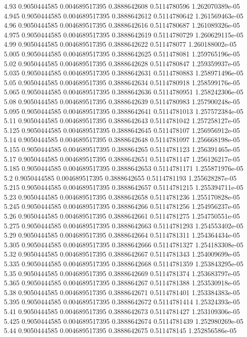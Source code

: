 {4.93 0.9050444585 0.004689517395 0.3888642608 0.5114780596 1.262070389e-05
4.945 0.9050444585 0.004689517395 0.3888642612 0.5114780642 1.261569463e-05
4.96 0.9050444585 0.004689517395 0.3888642616 0.5114780687 1.261089326e-05
4.975 0.9050444585 0.004689517395 0.3888642619 0.5114780729 1.260629115e-05
4.99 0.9050444585 0.004689517395 0.3888642622 0.511478077 1.260188002e-05
5.005 0.9050444585 0.004689517395 0.3888642625 0.511478081 1.259765196e-05
5.02 0.9050444585 0.004689517395 0.3888642628 0.5114780847 1.259359937e-05
5.035 0.9050444585 0.004689517395 0.3888642631 0.5114780883 1.258971496e-05
5.05 0.9050444585 0.004689517395 0.3888642634 0.5114780918 1.258599176e-05
5.065 0.9050444585 0.004689517395 0.3888642636 0.5114780951 1.258242306e-05
5.08 0.9050444585 0.004689517395 0.3888642639 0.5114780983 1.257900248e-05
5.095 0.9050444585 0.004689517395 0.3888642641 0.5114781013 1.257572384e-05
5.11 0.9050444585 0.004689517395 0.3888642643 0.5114781042 1.257258127e-05
5.125 0.9050444585 0.004689517395 0.3888642645 0.511478107 1.256956912e-05
5.14 0.9050444585 0.004689517395 0.3888642648 0.5114781097 1.256668198e-05
5.155 0.9050444585 0.004689517395 0.388864265 0.5114781123 1.256391465e-05
5.17 0.9050444585 0.004689517395 0.3888642651 0.5114781147 1.256126217e-05
5.185 0.9050444585 0.004689517395 0.3888642653 0.5114781171 1.255871976e-05
5.2 0.9050444585 0.004689517395 0.3888642655 0.5114781193 1.255628287e-05
5.215 0.9050444585 0.004689517395 0.3888642657 0.5114781215 1.255394711e-05
5.23 0.9050444585 0.004689517395 0.3888642658 0.5114781236 1.255170828e-05
5.245 0.9050444585 0.004689517395 0.388864266 0.5114781256 1.254956237e-05
5.26 0.9050444585 0.004689517395 0.3888642661 0.5114781275 1.254750551e-05
5.275 0.9050444585 0.004689517395 0.3888642663 0.5114781293 1.254553402e-05
5.29 0.9050444585 0.004689517395 0.3888642664 0.5114781311 1.254364434e-05
5.305 0.9050444585 0.004689517395 0.3888642666 0.5114781327 1.254183308e-05
5.32 0.9050444585 0.004689517395 0.3888642667 0.5114781343 1.254009699e-05
5.335 0.9050444585 0.004689517395 0.3888642668 0.5114781359 1.253843295e-05
5.35 0.9050444585 0.004689517395 0.3888642669 0.5114781374 1.253683797e-05
5.365 0.9050444585 0.004689517395 0.388864267 0.5114781388 1.253530918e-05
5.38 0.9050444585 0.004689517395 0.3888642671 0.5114781401 1.253384383e-05
5.395 0.9050444585 0.004689517395 0.3888642672 0.5114781414 1.25324393e-05
5.41 0.9050444585 0.004689517395 0.3888642673 0.5114781427 1.253109306e-05
5.425 0.9050444585 0.004689517395 0.3888642674 0.5114781439 1.252980269e-05
5.44 0.9050444585 0.004689517395 0.3888642675 0.511478145 1.252856586e-05
}
